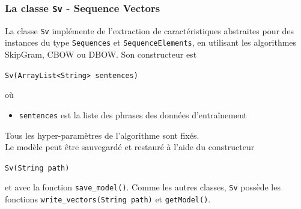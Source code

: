 \documentclass[10pt,a4paper]{article}
\newcommand\tab[1][0.5cm]{\hspace*{#1}}
\begin{document}
\subsubsection{La classe \texttt{Sv} - Sequence Vectors}
La classe \texttt{Sv} implémente de l'extraction de caractéristiques abstraites pour des instances du type \texttt{Sequences} et \texttt{SequenceElements}, en utilisant les algorithmes SkipGram, CBOW ou DBOW. Son constructeur est 
\begin{center}
\texttt{Sv(ArrayList<String> sentences)}
\end{center}
où
\begin{itemize}
\item \texttt{sentences} est la liste des phrases des données d'entraînement
\end{itemize}
Tous les hyper-paramètres de l'algorithme sont fixés.\\
\tab Le modèle peut être sauvegardé et restauré à l'aide du constructeur
\begin{center}
\texttt{Sv(String path)}
\end{center}
et avec la fonction \texttt{save\_model()}. Comme les autres classes, \texttt{Sv} possède les fonctions \texttt{write\_vectors(String path)} et \texttt{getModel()}.
\end{document}
